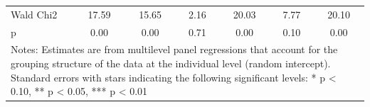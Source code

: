 {\begin{tabular}{l*{6}{c}}
Wald Chi2           &       17.59         &       15.65         &        2.16         &       20.03         &        7.77         &       20.10         \\
p                   &        0.00         &        0.00         &        0.71         &        0.00         &        0.10         &        0.00         \\
\bottomrule
\multicolumn{7}{l}{\footnotesize Notes: Estimates are from multilevel panel regressions that account for the grouping structure of the data at the individual level (random intercept). Standard errors with stars indicating the following significant levels: * p < 0.10, ** p < 0.05, *** p < 0.01}\\
\end{tabular}
}
